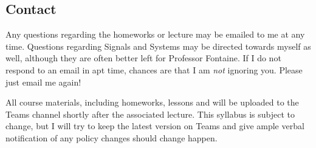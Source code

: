 \documentclass{article}
\begin{document}
	\clearpage
	\subsection*{Contact}
	Any questions regarding the homeworks or lecture may be emailed to me at any time. Questions regarding Signals and Systems may be directed towards myself as well, although they are often better left for Professor Fontaine. If I do not respond to an email in apt time, chances are that I am \textit{not} ignoring you. Please just email me again!
	
	All course materials, including homeworks, lessons and will be uploaded to the Teams channel shortly after the associated lecture. This syllabus is subject to change, but I will try to keep the latest version on Teams and give ample verbal notification of any policy changes should change happen.
\end{document}
